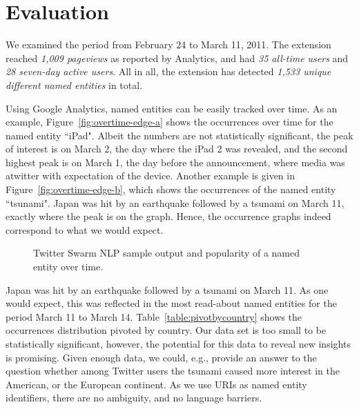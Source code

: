 \documentclass[runningheads,a4paper]{llncs}
\begin{document}
\section{Evaluation}
We examined the period from February 24 to March 11, 2011. The extension reached \textit{1,009 pageviews} as reported by Analytics, and had \textit{35 all-time users} and \textit{28 seven-day active users}. All in all, the extension has detected \textit{1,533 unique different named entities} in total. 

Using Google Analytics, named entities can be easily tracked over time. As an example, Figure~\ref{fig:overtime-edge-a} shows  the occurrences over time for the named entity ``iPad". Albeit the numbers are not statistically significant, the peak of interest is on March 2, the day where the iPad 2 was revealed, and the second highest peak is on March 1, the day before the announcement, where media was atwitter with expectation of the device. Another example is given in Figure~\ref{fig:overtime-edge-b}, which shows the occurrences of the named entity ``tsunami". Japan was hit by an earthquake followed by a tsunami on March 11, exactly where the peak is on the graph. Hence, the occurrence graphs indeed correspond to what we would expect.

\begin{figure}[htb!]
  \begin{center}
  \end{center}
  \caption{Twitter Swarm NLP sample output and popularity of a named entity over time.}
  \label{fig:overtime}
\end{figure}

Japan was hit by an earthquake followed by a tsunami on March 11. As one would expect, this was reflected in the most read-about named entities for the period March 11 to March 14. Table~\ref{table:pivotbycountry} shows the occurrences distribution pivoted by country. Our data set is too small to be statistically significant, however, the potential for this data to reveal new insights is promising. Given enough data, we could, e.g., provide an answer to the question whether among Twitter users the tsunami caused more interest in the American, or the European continent. As we use URIs as named entity identifiers, there are no ambiguity, and no language barriers.
\end{document}

